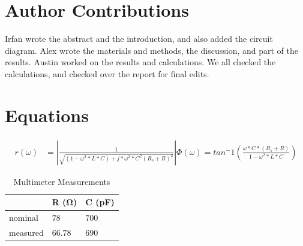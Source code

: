 \documentclass[10pt,twocolumn]{article}
\begin{document}
\section{Author Contributions}

Irfan wrote the abstract and the introduction, and also added the circuit diagram. Alex wrote the materials and methods, the discussion, and part of the results. Austin worked on the results and calculations. We all checked the calculations, and checked over the report for final edits.

\section{Equations}


\begin{align*}
	
	 r(\omega) &= |\frac{1}{\sqrt{\left(1 - \omega^2*L*C\right) + j*\omega^2*C^2\left(R_{s}+R\right)^2}}|
	 
	 \Phi(\omega) = tan^-1(\frac{\omega*C*\left(R_{s}+R\right)}{1-\omega^2*L*C})
\end{align*}

\begin{table}[bt]
	\begin{tabularx}{1\linewidth}{ lXX }
		\hline
		 & \textbf{R (Ω)} & \textbf{C (pF)} \\
		\hline
		nominal & $78$ & $700$ \\
		measured & $66.78$ & $690$ \\
		\hline
	\end{tabularx}
	\caption{Multimeter Measurements}
	\label{tab:Tab1}
\end{table}
\end{document}
